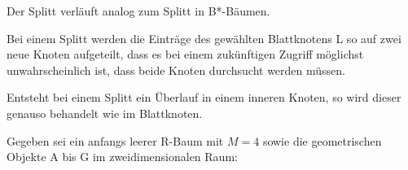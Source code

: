 \begin{solution}
	Der Splitt verläuft analog zum Splitt in B*-Bäumen.

	Bei einem Splitt werden die Einträge des gewählten Blattknotens L so auf
	zwei neue Knoten aufgeteilt, dass es bei einem zukünftigen Zugriff möglichst
	unwahrscheinlich ist, dass beide Knoten durchsucht werden müssen.

	Entsteht bei einem Splitt ein Überlauf in einem inneren Knoten, so wird dieser genauso behandelt wie im Blattknoten.
\end{solution}


\newdimen\R
\R=0.5cm

\newcommand{\nodeA} {
	\draw (1.5, 4.5) circle (\R) node {A};
}
\newcommand{\nodeB} {
	\draw[xshift=5cm,yshift=4.3cm] (0:\R) \foreach \x in {72,144,...,359} {
		-- (\x:\R)
	} -- cycle (0:\R) node {B \hspace{0.8cm} } ;
}
\newcommand{\nodeC} {
	\draw (2  , 3.3) circle (\R) node {C};
}
\newcommand{\nodeD} {
	\draw (5  , 2.5) circle (\R) node {D};
}
\newcommand{\nodeE} {
	\draw[xshift=1.6cm,yshift=1.7cm] (0:\R) \foreach \x in {120,240} {
		-- (\x:\R)
	} -- cycle (0:\R) node {E \hspace{0.9cm} } ;
}
\newcommand{\nodeF} {
	\draw (0.9, 3.2) circle (\R) node {F};
}
\newcommand{\nodeG} {
	\draw (2.7, 1.0) circle (\R) node {G};
}
\newcommand{\nodeEred} {
	\draw[color=red,xshift=1.6cm,yshift=1.7cm] (0:\R) \foreach \x in {120,240} {
		-- (\x:\R)
	} -- cycle (0:\R) node {E \hspace{0.9cm} } ;
}
\newcommand{\nodeFred} {
	\draw[color=red] (0.9, 3.2) circle (\R) node {F};
}
\newcommand{\nodeGred} {
	\draw[color=red] (2.7, 1.0) circle (\R) node {G};
}


\newcommand{\RA} {
	\draw (1  , 4  ) rectangle (2  , 5  ) node[pos=0.9,anchor=south east] {R1};
}
\newcommand{\RB} {
	\draw (4.56, 3.8) rectangle (5.5, 4.8) node[pos=0.9,anchor=south east] {R2};
}
\newcommand{\RC} {
	\draw (1.5, 3.8) rectangle (2.5, 2.8) node[pos=0.9,anchor=north east] {R3};
}
\newcommand{\RD} {
	\draw (4.5, 3.0) rectangle (5.5, 2.0) node[pos=0.9,anchor=north east] {R4};
}
\newcommand{\RE} {
	\draw (1.32, 2.2) rectangle (2.1, 1.2) node[pos=0.9,anchor=north east] {R5};
}
\newcommand{\RF} {
	\draw (0.4, 3.7) rectangle (1.4, 2.7) node[pos=0.9,anchor=north east] {R8};
}
\newcommand{\RG} {
	\draw (2.2, 1.5) rectangle (3.2, 0.5) node[pos=0.9,anchor=north east] {R9};
}


Gegeben sei ein anfangs leerer R-Baum mit $M=4$ sowie die geometrischen Objekte A bis G im zweidimensionalen Raum:

